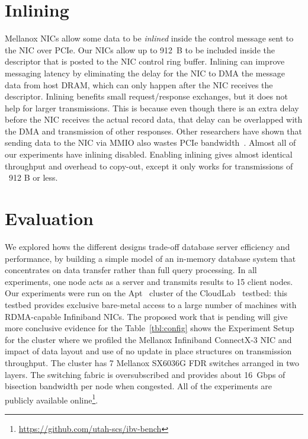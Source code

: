 \section{Inlining}
Mellanox NICs allow some data to be {\em inlined} inside the control message
sent to the NIC over PCIe. Our NICs allow up to 912~B to be included inside the
descriptor that is posted to the NIC control ring buffer.  Inlining can improve
messaging latency by eliminating the delay for the NIC to DMA the message data
from host DRAM, which can only happen after the NIC receives the descriptor.
Inlining benefits small request/response exchanges, but it does not help for
larger transmissions. This is because even though there is an extra delay
before the NIC receives the actual record data, that delay can be overlapped
with the DMA and transmission of other responses. Other researchers have shown
that sending data to the NIC via MMIO also wastes PCIe bandwidth~\cite{rdma}.
Almost all of our experiments have inlining disabled. Enabling inlining
gives almost identical throughput and overhead to copy-out, except it only
works for transmissions of ~912 B or less.


\section{Evaluation}





We explored hows the different designs trade-off database server efficiency and
performance, by building a simple model of an in-memory database system that
concentrates on data transfer rather than full query processing. In all experiments,
one node acts as a server and transmits results to 15 client nodes.
Our experiments were run on the Apt~\cite{Ricci+:OSR15} cluster of the
CloudLab~\cite{Cloudlab:URL} testbed: this testbed provides exclusive bare-metal
access to a large number of machines with RDMA-capable Infiniband NICs.
The proposed work that is pending will give more conclusive evidence for the 
Table~\ref{tbl:config} shows the Experiment Setup for the cluster where we profiled
the Mellanox Infiniband ConnectX-3 \textregistered NIC and impact of data layout and 
use of no update in place structures on transmission throughput. The cluster has 7
Mellanox SX6036G FDR switches arranged in two layers. The switching fabric is
oversubscribed and provides about 16~Gbps of bisection bandwidth per node
when congested. All of the experiments are
publicly available online\footnote{\url{https://github.com/utah-scs/ibv-bench}}.




